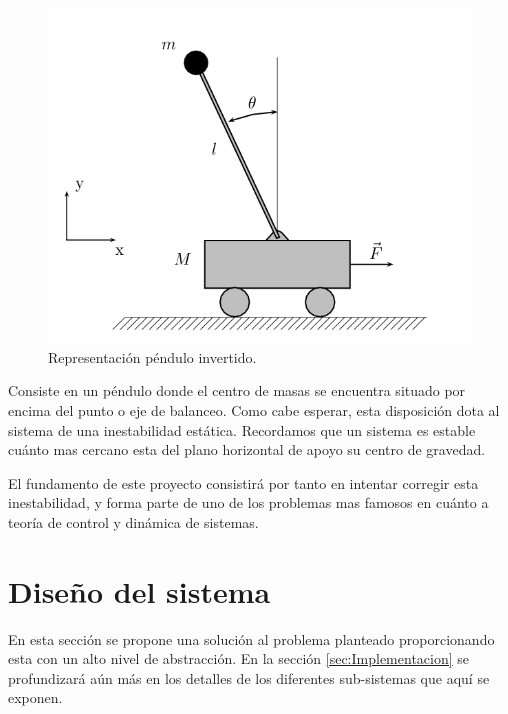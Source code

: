 \begin{figure}[H]
	\center
	\includegraphics[trim = 0mm 0mm 0mm 0mm, clip,scale=1.6]{imagenes/Balancing_robot/pendulo}
	\caption{Representación péndulo invertido.}
	\label{fig:pendulo}
\end{figure}

Consiste en un péndulo donde el centro de masas se encuentra situado por encima del punto o eje de balanceo. Como cabe esperar, esta disposición dota al sistema de una inestabilidad estática. Recordamos que un sistema es estable cuánto mas cercano esta del plano horizontal de apoyo su centro de gravedad. \newline

El fundamento de este proyecto consistirá por tanto en intentar corregir esta inestabilidad, y forma parte de uno de los problemas mas famosos en cuánto a teoría de control y dinámica de sistemas. 

\newpage
\section{Diseño del sistema}
En esta sección se propone una solución al problema planteado proporcionando esta con un alto nivel de abstracción. En la sección \ref{sec:Implementacion} se profundizará aún más en los detalles de los diferentes sub-sistemas que aquí se exponen.
